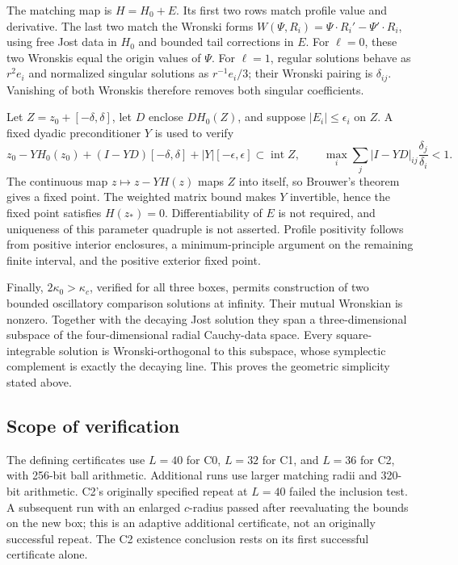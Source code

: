 The matching map is $H=H_0+E$. Its first two rows match profile value
and derivative. The last two match the Wronski forms
$W(\Psi,R_i)=\Psi\mathbin{\cdot}R_i'-\Psi'\mathbin{\cdot}R_i$,
using free Jost data in $H_0$ and bounded tail corrections in $E$.
For $\ell=0$, these two Wronskis equal the origin values of $\Psi$.
For $\ell=1$, regular solutions behave as $r^2e_i$ and normalized
singular solutions as $r^{-1}e_i/3$; their Wronski pairing is
$\delta_{ij}$. Vanishing of both Wronskis therefore removes both
singular coefficients.

Let $Z=z_0+[-\delta,\delta]$, let $D$ enclose $DH_0(Z)$, and suppose
$|E_i|\leq\epsilon_i$ on $Z$. A fixed dyadic preconditioner $Y$ is used
to verify
\begin{equation}
 z_0-YH_0(z_0)+(I-YD)[-\delta,\delta]
             +|Y|[-\epsilon,\epsilon]\subset\operatorname{int}Z,
 \qquad
 \max_i\sum_j |I-YD|_{ij}\frac{\delta_j}{\delta_i}<1.
 \label{eq:proof-krawczyk-inclusion}
\end{equation}
The continuous map $z\mapsto z-YH(z)$ maps $Z$ into itself, so Brouwer's
theorem gives a fixed point. The weighted matrix bound makes $Y$
invertible, hence the fixed point satisfies $H(z_*)=0$. Differentiability
of $E$ is not required, and uniqueness of this parameter quadruple is
not asserted. Profile positivity follows from positive interior
enclosures, a minimum-principle argument on the remaining finite
interval, and the positive exterior fixed point.

Finally, $2\kappa_0>\kappa_c$, verified for all three boxes, permits
construction of two bounded oscillatory comparison solutions at infinity.
Their mutual Wronskian is nonzero. Together with the decaying Jost
solution they span a three-dimensional subspace of the four-dimensional
radial Cauchy-data space. Every square-integrable solution is
Wronski-orthogonal to this subspace, whose symplectic complement is
exactly the decaying line. This proves the geometric simplicity stated
above.

\subsection{Scope of verification}
\label{sec:proof-verification-limits}
The defining certificates use $L=40$ for C0, $L=32$ for C1, and $L=36$
for C2, with 256-bit ball arithmetic. Additional runs use larger matching
radii and 320-bit arithmetic. C2's originally specified repeat at $L=40$
failed the inclusion test. A subsequent run with an enlarged $c$-radius
passed after reevaluating the bounds on the new box; this is an adaptive
additional certificate, not an originally successful repeat. The C2
existence conclusion rests on its first successful certificate alone.

